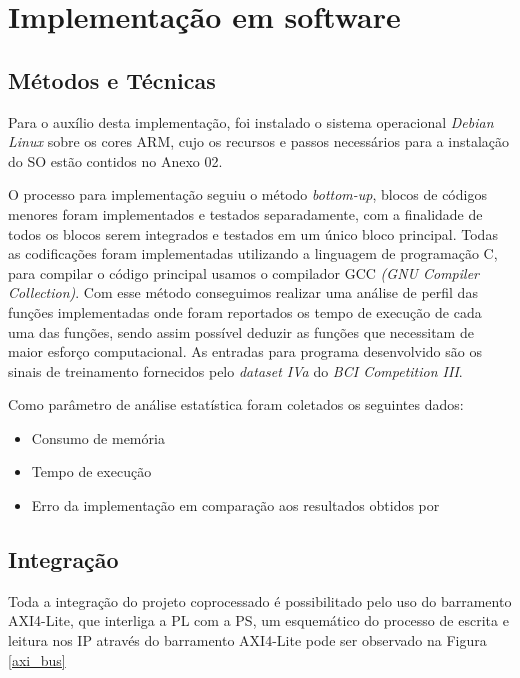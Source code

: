 \section{Implementação em software}

\subsection{Métodos e Técnicas}
Para o auxílio desta implementação, foi instalado o sistema operacional \textit{Debian Linux} sobre os cores ARM, cujo os recursos e passos necessários
para a instalação do SO estão contidos no Anexo 02.

O processo para implementação seguiu o método \textit{bottom-up}, blocos de códigos menores foram implementados e testados separadamente, com a finalidade de todos os blocos serem integrados e testados em um único bloco principal. Todas as codificações foram implementadas utilizando a linguagem de programação C, para compilar o código principal usamos o compilador GCC \textit{(GNU Compiler Collection)}. Com esse método conseguimos realizar uma análise de perfil das funções implementadas onde foram reportados os tempo de execução de cada uma das funções, sendo assim possível deduzir as funções que necessitam de maior esforço computacional. As entradas para programa desenvolvido são os sinais de treinamento fornecidos pelo \textit{dataset IVa} do \textit{BCI Competition III}.

Como parâmetro de análise estatística foram coletados os seguintes dados:

\begin{itemize}[noitemsep]
\item Consumo de memória
\item Tempo de execução
\item Erro da implementação em comparação aos resultados obtidos por \cite{F.Lotte}
\end{itemize}

\subsection{Integração}
Toda a integração do projeto coprocessado é possibilitado pelo uso do barramento AXI4-Lite, que interliga a PL com a PS, 
um esquemático do processo de escrita e leitura nos IP através do barramento AXI4-Lite pode ser observado na Figura \ref{axi_bus}
\newpage

